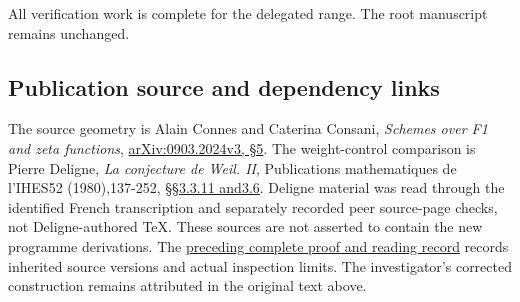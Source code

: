 All verification work is complete for the delegated range. The root
manuscript remains unchanged.

\subsection{Publication source and dependency
links}\label{publication-source-and-dependency-links}

The source geometry is Alain Connes and Caterina Consani, \emph{Schemes
over F1 and zeta functions},
\href{https://arxiv.org/abs/0903.2024v3}{arXiv:0903.2024v3, §5}. The
weight-control comparison is Pierre Deligne, \emph{La conjecture de
Weil. II}, Publications mathematiques de l'IHES52 (1980),137-252,
\href{https://www.numdam.org/item/PMIHES_1980__52__137_0/}{§§3.3.11
and3.6}. Deligne material was read through the identified French
transcription and separately recorded peer source-page checks, not
Deligne-authored TeX. These sources are not asserted to contain the new
programme derivations. The
\href{https://github.com/KokunoYumeto/zeta-function-research-reader/blob/36a82ecca98addb8a98b48204e349737856c7223/workbenches/splitzero-tandem/continuations/20260924-cohomology-weight-and-character-lifts/BUILD_AND_REVIEW.md}{preceding
complete proof and reading record} records inherited source versions and
actual inspection limits. The investigator's corrected construction
remains attributed in the original text above.

